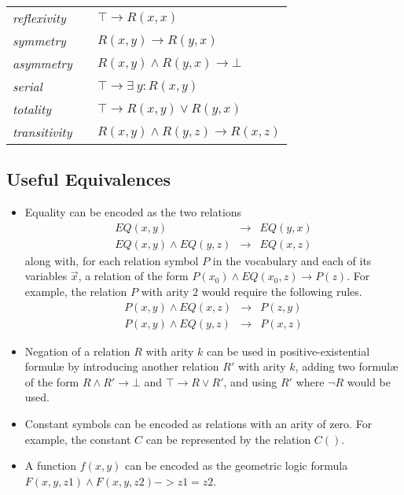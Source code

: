 			\begin{tabular}{lll}
			\emph{reflexivity}   & \qquad & $\top \to R(x,x)$                  \\
			\emph{symmetry}      & \qquad & $R(x,y) \to R(y,x)$                \\
			\emph{asymmetry}     & \qquad & $R(x,y) \wedge R(y,x) \to \bot$    \\
			\emph{serial}        & \qquad & $\top \to \exists\ y : R(x,y)$     \\
			\emph{totality}      & \qquad & $\top \to R(x,y) \vee R(y,x)$      \\
			\emph{transitivity}  & \qquad & $R(x,y) \wedge R(y,z) \to R(x,z)$
			\end{tabular}

		\subsection{Useful Equivalences}
		\label{sec:technical_background.geometric_logic.useful_equivalences}

			\begin{itemize}
			\item
			Equality can be encoded as the two relations
				\begin{eqnarray*}
				EQ(x,y)                & \to & EQ(y,x)  \\
				EQ(x,y) \wedge EQ(y,z) & \to & EQ(x,z)
				\end{eqnarray*}
			along with, for each relation symbol $P$ in the vocabulary and each
			of its variables $\vec x$, a relation of the form $P(x_0) \wedge
			EQ(x_0,z) \to P(z)$. For example, the relation $P$ with arity $2$
			would require the following rules.
				\begin{eqnarray*}
				P(x,y) \wedge EQ(x,z) & \to & P(z,y)  \\
				P(x,y) \wedge EQ(y,z) & \to & P(x,z)
				\end{eqnarray*}

			\item
			Negation of a relation $R$ with arity $k$ can be used in
			positive-existential formul{\ae} by introducing another relation
			$R'$ with arity $k$, adding two formul{\ae} of the form $R \wedge
			R' \to \bot$ and $\top \to R \vee R'$, and using $R'$ where $\neg
			R$ would be used.

			\item
			Constant symbols can be encoded as relations with an arity of zero.
			For example, the constant $C$ can be represented by the relation
			$C()$.

			\item
			A function $f(x,y)$ can be encoded as the geometric logic formula
			$F(x,y,z1) \wedge F(x,y,z2) -> z1 = z2$.
			\end{itemize}
